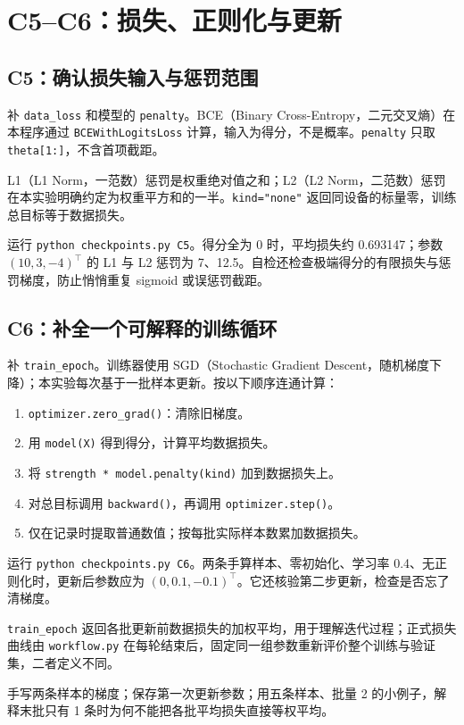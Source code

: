 \documentclass[UTF8,a4paper,11pt,fontset=fandol]{ctexart}
\begin{document}
\section{C5--C6：损失、正则化与更新}
\subsection{C5：确认损失输入与惩罚范围}
补 \texttt{data\_loss} 和模型的 \texttt{penalty}。BCE（Binary Cross-Entropy，二元交叉熵）在本程序通过 \texttt{BCEWithLogitsLoss} 计算，输入为得分，不是概率。\texttt{penalty} 只取 \texttt{theta[1:]}，不含首项截距。

L1（L1 Norm，一范数）惩罚是权重绝对值之和；L2（L2 Norm，二范数）惩罚在本实验明确约定为权重平方和的一半。\texttt{kind="none"} 返回同设备的标量零，训练总目标等于数据损失。

运行 \texttt{python checkpoints.py C5}。得分全为 0 时，平均损失约 0.693147；参数 $(10,3,-4)^\top$ 的 L1 与 L2 惩罚为 7、12.5。自检还检查极端得分的有限损失与惩罚梯度，防止悄悄重复 sigmoid 或误惩罚截距。
\subsection{C6：补全一个可解释的训练循环}
补 \texttt{train\_epoch}。训练器使用 SGD（Stochastic Gradient Descent，随机梯度下降）；本实验每次基于一批样本更新。按以下顺序连通计算：
\begin{enumerate}
\item \texttt{optimizer.zero\_grad()}：清除旧梯度。
\item 用 \texttt{model(X)} 得到得分，计算平均数据损失。
\item 将 \texttt{strength * model.penalty(kind)} 加到数据损失上。
\item 对总目标调用 \texttt{backward()}，再调用 \texttt{optimizer.step()}。
\item 仅在记录时提取普通数值；按每批实际样本数累加数据损失。
\end{enumerate}
运行 \texttt{python checkpoints.py C6}。两条手算样本、零初始化、学习率 0.4、无正则化时，更新后参数应为 $(0,0.1,-0.1)^\top$。它还核验第二步更新，检查是否忘了清梯度。
\begin{pitfallbox}[记录和优化不要混为一谈]
\texttt{train\_epoch} 返回各批更新前数据损失的加权平均，用于理解迭代过程；正式损失曲线由 \texttt{workflow.py} 在每轮结束后，固定同一组参数重新评价整个训练与验证集，二者定义不同。
\end{pitfallbox}
\begin{questionbox}[验收证据]
手写两条样本的梯度；保存第一次更新参数；用五条样本、批量 2 的小例子，解释末批只有 1 条时为何不能把各批平均损失直接等权平均。
\end{questionbox}
\clearpage
\end{document}
